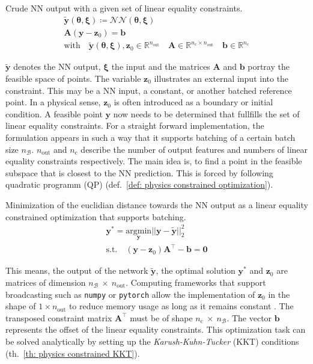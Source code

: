 \begin{definition} Crude NN output with a given set of linear equality constraints.
    \label{def: physics consistency}
    \[
        \begin{gathered}
        \bm{\tilde{y}}(\bm{\theta}, \bm{\xi}) \coloneq \mathcal{NN}(\bm{\theta}, \bm{\xi})
        \\
        \bm{A} (\bm{y} - \bm{z}_0) = \bm{b}
        \\
        \text{with}
        \quad
        \bm{\tilde{y}}(\bm{\theta}, \bm{\xi}), \bm{z}_0 \in \mathbb{R}^{n_\text{out}}
        \quad
        \bm{A} \in \mathbb{R}^{n_\text{c} \times n_\text{out}}
        \quad
        \bm{b} \in \mathbb{R}^{n_{\text{c}}}
        \end{gathered}
    \]
\end{definition}


$\bm{\tilde{y}}$ denotes the NN output, $\bm{\xi}$ the input and the matrices $\bm{A}$ and $\bm{b}$ portray the feasible space of points.
The variable $\bm{z}_0$ illustrates an external input into the constraint. This may be a NN input, a constant, or another batched 
reference point. In a physical sense, $\bm{z}_0$ is often introduced as a boundary or initial condition.
A feasible point $\bm{y}$ now needs to be determined that fullfills the set of linear equality constraints.
For a straight forward implementation, the formulation appears in such a way that it supports batching of 
a certain batch size $n_\mathcal{B}$. $n_\text{out}$ and $n_\text{c}$ describe the number of output features and numbers
of linear equality constraints respectively. The main idea is, to find a point in the feasible subspace that is closest to the NN prediction. This is 
forced by following quadratic programm (QP) (def.~\ref{def: physics constrained optimization}).

\begin{definition} Minimization of the euclidian distance towards the NN output as a linear equality constrained optimization that supports batching.
    \label{def: physics constrained optimization}
    \[
        \begin{aligned}
            \bm{y}^* = \underset{\bm{y}}{\mathrm{argmin}} || \bm{y} - \bm{\tilde{y}} ||_2^2 
            \\
            \mathrm{s.t.} \quad (\bm{y} - \bm{z}_0) \bm{A}^\top - \bm{b} = \bm{0}
        \end{aligned}
    \]
\end{definition}
This means, the output of the network $\bm{\tilde{y}}$, the optimal solution $\bm{y}^*$ and $\bm{z}_0$ are matrices of
dimension $n_\mathcal{B}~\times~n_\text{out}$. Computing frameworks that support broadcasting such as \texttt{numpy} or
\texttt{pytorch} allow the implementation of $\bm{z}_0$ in the shape of $1 \times n_\text{out}$ to reduce memory usage as long as it remains constant \cite{empty000}.
The transposed constraint matrix $\bm{A}^\top$ must be of shape
$n_\text{c}~\times~n_\mathcal{B}$. The vector $\bm{b}$ represents the offset of the linear equality constraints. This optimization
task can be solved analytically by setting up the \emph{Karush-Kuhn-Tucker} (KKT) conditions (th.~\ref{th: physics constrained KKT}).

